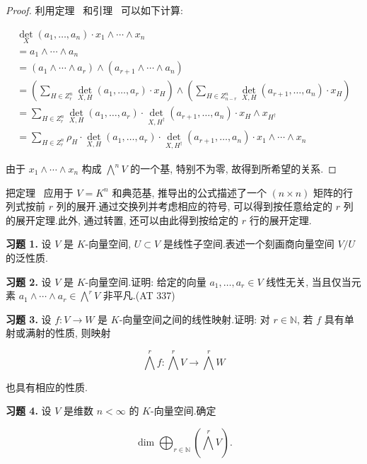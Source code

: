 \begin{proof}
利用定理~ 和引理~ 可以如下计算:

\[
\begin{array}{l}
\det_X(a_1, \ldots, a_n) \cdot x_1 \wedge \cdots \wedge x_n \\
= a_1 \wedge \cdots \wedge a_n \\
= (a_1 \wedge \cdots \wedge a_r) \wedge (a_{r+1} \wedge \cdots \wedge a_n) \\
= \left(\sum_{H \in Z_r^n} \det_{X, H}(a_1, \ldots, a_r) \cdot x_H\right) \wedge \left(\sum_{H \in Z_{n-r}^n} \det_{X, H}(a_{r+1}, \ldots, a_n) \cdot x_H\right) \\
= \sum_{H \in Z_r^n} \det_{X, H}(a_1, \ldots, a_r) \cdot \det_{X, H^{\dagger}}(a_{r+1}, \ldots, a_n) \cdot x_H \wedge x_{H^{\dagger}} \\
= \sum_{H \in Z_r^n} \rho_H \cdot \det_{X, H}(a_1, \ldots, a_r) \cdot \det_{X, H^{\dagger}}(a_{r+1}, \ldots, a_n) \cdot x_1 \wedge \cdots \wedge x_n
\end{array}
\]

由于 $x_1 \wedge \cdots \wedge x_n$ 构成 $\bigwedge^n V$ 的一个基, 特别不为零, 故得到所希望的关系.
\end{proof}

把定理~ 应用于 $V = K^n$ 和典范基, 推导出的公式描述了一个 $(n \times n)$ 矩阵的行列式按前 $r$ 列的展开.通过交换列并考虑相应的符号, 可以得到按任意给定的 $r$ 列的展开定理.此外, 通过转置, 还可以由此得到按给定的 $r$ 行的展开定理.

\aufgaben

\noindent\textbf{习题 1.} 设 $V$ 是 $K$-向量空间, $U \subset V$ 是线性子空间.表述一个刻画商向量空间 $V/U$ 的泛性质.

\medskip
\noindent\textbf{习题 2.} 设 $V$ 是 $K$-向量空间.证明: 给定的向量 $a_1, \ldots, a_r \in V$ 线性无关, 当且仅当元素 $a_1 \wedge \cdots \wedge a_r \in \bigwedge^r V$ 非平凡.(AT 337)

\medskip
\noindent\textbf{习题 3.} 设 $f \colon V \longrightarrow W$ 是 $K$-向量空间之间的线性映射.证明: 对 $r \in \mathbb{N}$, 若 $f$ 具有单射或满射的性质, 则映射

\[
\bigwedge^r f \colon \bigwedge^r V \longrightarrow \bigwedge^r W
\]

也具有相应的性质.

\medskip
\noindent\textbf{习题 4.} 设 $V$ 是维数 $n < \infty$ 的 $K$-向量空间.确定

\[
\dim \bigoplus_{r \in \mathbb{N}} \left(\bigwedge^r V\right).
\]

